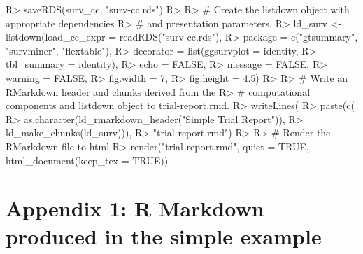 \documentclass[
]{jss}
\begin{document}
\begin{CodeChunk}

\begin{CodeInput}
R> saveRDS(surv_cc, "surv-cc.rds")
R> 
R> # Create the listdown object with appropriate dependencies
R> # and presentation parameters.
R> ld_surv <- listdown(load_cc_expr = readRDS("surv-cc.rds"),
R>                     package = c("gtsummary", "survminer", "flextable"),
R>                     decorator = list(ggsurvplot = identity,
R>                                      tbl_summary = identity),
R>                     echo = FALSE,
R>                     message = FALSE,
R>                     warning = FALSE,
R>                     fig.width = 7,
R>                     fig.height = 4.5)
R> 
R> # Write an RMarkdown header and chunks derived from the 
R> # computational components and listdown object to trial-report.rmd.
R> writeLines(
R>   paste(c(
R>     as.character(ld_rmarkdown_header("Simple Trial Report")),
R>     ld_make_chunks(ld_surv))),
R>   "trial-report.rmd")
R> 
R> # Render the RMarkdown file to html
R> render("trial-report.rmd", quiet = TRUE, html_document(keep_tex = TRUE))  
\end{CodeInput}
\end{CodeChunk}



\section*{Appendix 1: R Markdown produced in the simple example}
\label{appendix}

\begin{CodeChunk}

\end{CodeChunk}
\end{document}

